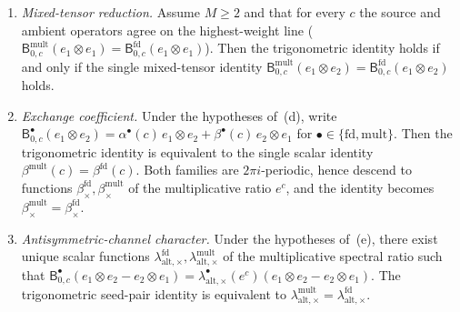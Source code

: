 \begin{theorem}
\begin{enumerate}[label=\textup{(\alph*)}]
\item\emph{Mixed-tensor reduction.}
 Assume \(M\ge 2\) and that for every \(c\) the source and ambient
 operators agree on the highest-weight line
 (\(\mathsf B_{0,c}^{\mathrm{mult}}(e_1\otimes e_1)
 = \mathsf B_{0,c}^{\mathrm{fd}}(e_1\otimes e_1)\)).
 Then the trigonometric identity holds if and only if the single
 mixed-tensor identity
 \(\mathsf B_{0,c}^{\mathrm{mult}}(e_1\otimes e_2)
 = \mathsf B_{0,c}^{\mathrm{fd}}(e_1\otimes e_2)\) holds.

\item\emph{Exchange coefficient.}
 Under the hypotheses of~\textup{(d)}, write
 \(\mathsf B_{0,c}^{\bullet}(e_1\otimes e_2)
 = \alpha^{\bullet}(c)\,e_1\otimes e_2
 + \beta^{\bullet}(c)\,e_2\otimes e_1\)
 for \(\bullet\in\{\mathrm{fd},\mathrm{mult}\}\).
 Then the trigonometric identity is equivalent to the single scalar
 identity \(\beta^{\mathrm{mult}}(c)=\beta^{\mathrm{fd}}(c)\).
 Both families are \(2\pi i\)-periodic, hence descend to functions
 \(\beta_\times^{\mathrm{fd}},\beta_\times^{\mathrm{mult}}\) of the
 multiplicative ratio \(e^c\), and the identity becomes
 \(\beta_\times^{\mathrm{mult}}=\beta_\times^{\mathrm{fd}}\).

\item\emph{Antisymmetric-channel character.}
 Under the hypotheses of~\textup{(e)}, there exist unique scalar
 functions
 \(\lambda_{\mathrm{alt},\times}^{\mathrm{fd}},
 \lambda_{\mathrm{alt},\times}^{\mathrm{mult}}\) of the
 multiplicative spectral ratio such that
 \(\mathsf B_{0,c}^{\bullet}(e_1\otimes e_2-e_2\otimes e_1)
 = \lambda_{\mathrm{alt},\times}^{\bullet}(e^c)
 (e_1\otimes e_2-e_2\otimes e_1)\).
 The trigonometric seed-pair identity is equivalent to
 \(\lambda_{\mathrm{alt},\times}^{\mathrm{mult}}
 = \lambda_{\mathrm{alt},\times}^{\mathrm{fd}}\).
\end{enumerate}
\end{theorem}

